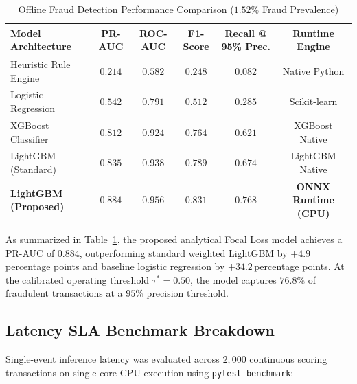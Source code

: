 \begin{table}[htbp]
\caption{Offline Fraud Detection Performance Comparison ($1.52\%$ Fraud Prevalence)}
\label{tab:model_comparison}
\centering
\small
\begin{tabular}{lccccc}
\toprule
\textbf{Model Architecture} & \textbf{PR-AUC} & \textbf{ROC-AUC} & \textbf{F1-Score} & \textbf{Recall @ 95\% Prec.} & \textbf{Runtime Engine} \\
\midrule
Heuristic Rule Engine       & $0.214$         & $0.582$          & $0.248$           & $0.082$                      & Native Python \\
Logistic Regression         & $0.542$         & $0.791$          & $0.512$           & $0.285$                      & Scikit-learn \\
XGBoost Classifier          & $0.812$         & $0.924$          & $0.764$           & $0.621$                      & XGBoost Native \\
LightGBM (Standard)         & $0.835$         & $0.938$          & $0.789$           & $0.674$                      & LightGBM Native \\
\textbf{LightGBM (Proposed)}& $\mathbf{0.884}$ & $\mathbf{0.956}$ & $\mathbf{0.831}$  & $\mathbf{0.768}$             & \textbf{ONNX Runtime (CPU)} \\
\bottomrule
\end{tabular}
\end{table}

As summarized in Table~\ref{tab:model_comparison}, the proposed analytical Focal Loss model achieves a PR-AUC of $\mathbf{0.884}$, outperforming standard weighted LightGBM by $+4.9$\,percentage points and baseline logistic regression by $+34.2$\,percentage points. At the calibrated operating threshold $\tau^* = 0.50$, the model captures $76.8\%$ of fraudulent transactions at a $95\%$ precision threshold.

\subsection{Latency SLA Benchmark Breakdown}
Single-event inference latency was evaluated across $2,000$ continuous scoring transactions on single-core CPU execution using \texttt{pytest-benchmark}:

